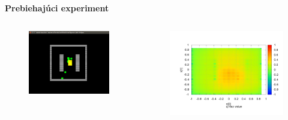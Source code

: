 \documentclass[xcolor=dvipsnames]{beamer}
\begin{document}
\begin{frame}[fragile]{\bf Prebiehajúci experiment}

    \begin{columns}
    	\begin{column}{0.4\textwidth}

            \begin{figure}[ht]

            \begin{center}
            \includegraphics[width=1.0\textwidth]{images/robots.png}
            \end{center}

            \end{figure}

    	\end{column}
    	\begin{column}{0.8\textwidth}

            \begin{figure}[ht]

            \begin{center}
            \includegraphics[width=1.0\textwidth]{images/q_max_grad.png}
            \end{center}


\end{figure}
\end{column}
\end{columns}
\end{frame}
\end{document}
